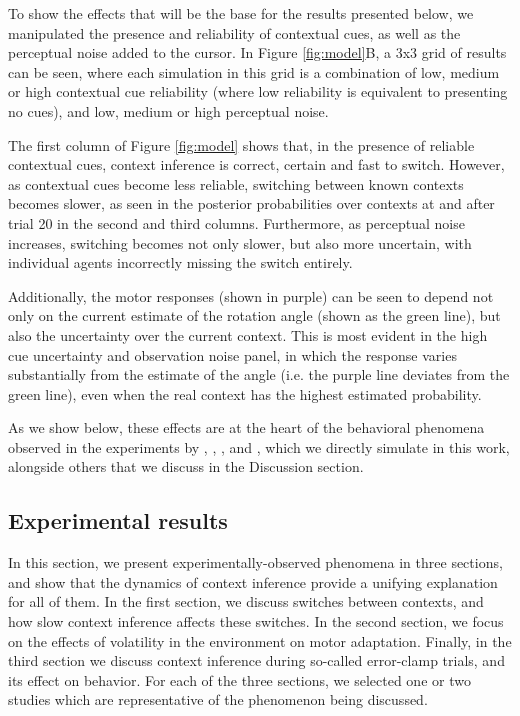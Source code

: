 \documentclass[a4paper,doc,floatsintext,natbib]{apa6}%
\def \fref #1{Figure \ref{#1}}     %
\begin{document}
To show the effects that will be the base for the results presented below, we manipulated the presence and reliability of contextual cues, as well as the perceptual noise added to the cursor. In \fref{fig:model}B, a 3x3 grid of results can be seen, where each simulation in this grid is a combination of low, medium or high contextual cue reliability (where low reliability is equivalent to presenting no cues), and low, medium or high perceptual noise.

The first column of \fref{fig:model} shows that, in the presence of reliable contextual cues, context inference is correct, certain and fast to switch. However, as contextual cues become less reliable, switching between known contexts becomes slower, as seen in the posterior probabilities over contexts at and after trial 20 in the second and third columns. Furthermore, as perceptual noise increases, switching becomes not only slower, but also more uncertain, with individual agents incorrectly missing the switch entirely.

Additionally, the motor responses (shown in purple) can be seen to depend not only on the current estimate of the rotation angle (shown as the green line), but also the uncertainty over the current context. This is most evident in the high cue uncertainty and observation noise panel, in which the response varies substantially from the estimate of the angle (i.e. the purple line deviates from the green line), even when the real context has the highest estimated probability.

As we show below, these effects are at the heart of the behavioral phenomena observed in the experiments by \cite{Kim_Neural_2015}, \cite{Oh_Minimizing_2019}, \cite{Davidson_Scaling_2004}, and \cite{Vaswani_Decay_2013}, which we directly simulate in this work, alongside others that we discuss in the Discussion section.



\subsection{Experimental results}
In this section, we present experimentally-observed phenomena in three sections, and show that the dynamics of context inference provide a unifying explanation for all of them. In the first section, we discuss switches between contexts, and how slow context inference affects these switches. In the second section, we focus on the effects of volatility in the environment on motor adaptation. Finally, in the third section we discuss context inference during so-called error-clamp trials, and its effect on behavior. For each of the three sections, we selected one or two studies which are representative of the phenomenon being discussed.
\end{document}
